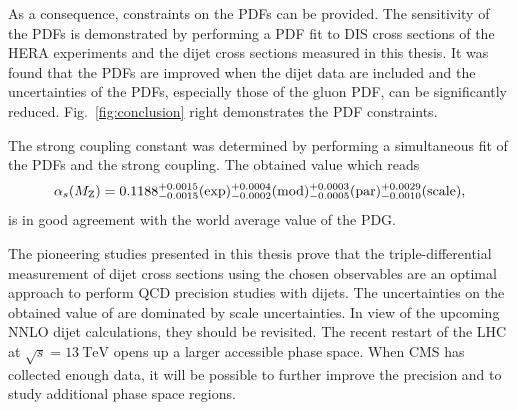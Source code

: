 As a consequence, constraints on the PDFs can be provided. The sensitivity of
the PDFs is demonstrated by performing a PDF fit to DIS cross sections of the
HERA experiments and the dijet cross sections measured in this thesis. It was
found that the PDFs are improved when the dijet data are included and the
uncertainties of the PDFs, especially those of the gluon PDF, can be
significantly reduced. Fig.~\ref{fig:conclusion} right demonstrates the PDF
constraints.

The strong coupling constant \asmz was determined by performing a simultaneous
fit of the PDFs and the strong coupling. The obtained value which reads
%
\begin{equation*}
  \alpha_{s}(M_\mathrm{Z}) = 0.1188_{-0.0015}^{+0.0015}(\mathrm{exp})_{-0.0002}^{+0.0004}(\mathrm{mod})_{-0.0005}^{+0.0003}(\mathrm{par})_{-0.0010}^{+0.0029}(\mathrm{scale}),
\end{equation*}
%
is in good agreement with the world average value of the PDG. 

The pioneering studies presented in this thesis prove that the triple-differential
measurement of dijet cross sections using the chosen observables are an optimal
approach to perform QCD precision studies with dijets. The uncertainties on the
obtained value of \asmz are dominated by scale uncertainties. In view of
the upcoming NNLO dijet calculations, they should be revisited. The recent
restart of the LHC at $\sqrt{s}=\SI{13}{\TeV}$ opens up a larger accessible
phase space. When CMS has collected enough data, it will be possible to further
improve the precision and to study additional phase space regions.

